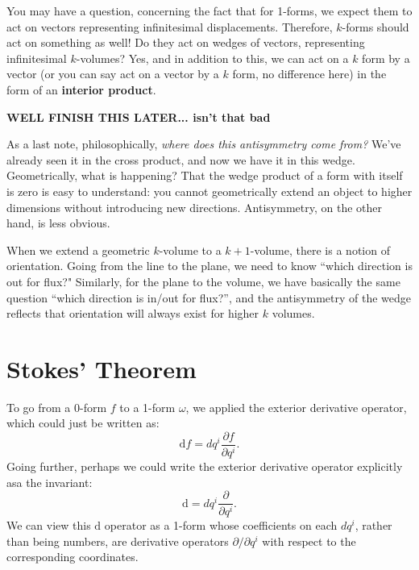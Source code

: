 	You may have a question, concerning the fact that for 1-forms, we expect them to act on vectors representing infinitesimal displacements. Therefore, $k$-forms should act on something as well! Do they act on wedges of vectors, representing infinitesimal $k$-volumes? Yes, and in addition to this, we can act on a $k$ form by a vector (or you can say act on a vector by a $k$ form, no difference here) in the form of an \textbf{interior product}. 
	
	\textbf{WELL FINISH THIS LATER... isn't that bad}
	
	As a last note, philosophically, \emph{where does this antisymmetry come from?} We've already seen it in the cross product, and now we have it in this wedge. Geometrically, what is happening? That the wedge product of a form with itself is zero is easy to understand: you cannot geometrically extend an object to higher dimensions without introducing new directions. Antisymmetry, on the other hand, is less obvious.
	
	 When we extend a geometric $k$-volume to a $k+1$-volume, there is a notion of orientation. Going from the line to the plane, we need to know ``which direction is out for flux?" Similarly, for the plane to the volume, we have basically the same question ``which direction is in/out for flux?'', and the antisymmetry of the wedge reflects that orientation will always exist for higher $k$ volumes.
	
	
	\section{Stokes' Theorem} %
	\label{sec:stokes_theorem}
	
	
	To go from a 0-form $f$ to a 1-form $\omega$, we applied the exterior derivative operator, which could just be written as:
	\begin{equation}
		\mathrm df = dq^i \frac{\partial f}{\partial q^i}.
	\end{equation}
	Going further, perhaps we could write the exterior derivative operator explicitly asa the invariant: 
	\begin{equation}\label{eq:exterior_derivative}
		\mathrm d = dq^i \frac{\partial}{\partial q^i}.
	\end{equation}
	We can view this $\mathrm d$ operator as a 1-form whose coefficients on each $dq^i$, rather than being numbers, are derivative operators $\partial/\partial q^i$ with respect to the corresponding coordinates. 
	
